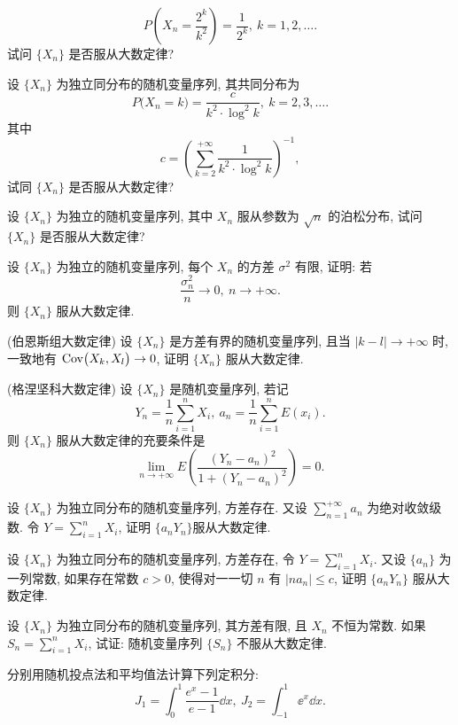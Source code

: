 \begin{xiti}
\begin{equation*}
        P \left( X_n = \frac{2^k}{k^2} \right) = \frac{1}{2^k}, \ k = 1, 2, \dotsc .
    \end{equation*}
    试问 $ \{ X_n \} $ 是否服从大数定律?
    \item 设 $ \{ X_n \} $ 为独立同分布的随机变量序列, 其共同分布为
    \begin{equation*}
        P \bigl( X_n = k \bigr) = \frac{c}{k^2 \cdot \log^2 k}, \ k = 2, 3, \dotsc .
    \end{equation*}
    其中
    \begin{equation*}
        c = \left( \sum_{k = 2}^{+\infty} \frac{1}{k^2 \cdot \log^2 k} \right)^{-1},
    \end{equation*}
    试同 $ \{ X_n \} $ 是否服从大数定律?
    \item 设 $ \{ X_n \} $ 为独立的随机变量序列, 其中 $ X_n $ 服从参数为 $ \sqrt{n} $ 的泊松分布, 试问 $ \{ X_n \} $ 是否服从大数定律?
    \item 设 $ \{ X_n \} $ 为独立的随机变量序列, 每个 $ X_n $ 的方差 $ \sigma^2 $ 有限, 证明: 若
    \begin{equation*}
        \frac{\sigma_n^2}{n} \to 0, \ n \to +\infty.
    \end{equation*}
    则 $ \{ X_n \} $ 服从大数定律.
    \item (伯恩斯组大数定律) 设 $ \{ X_n \} $ 是方差有界的随机变量序列, 且当 $ \lvert k - l \rvert \to +\infty $ 时, 一致地有 $\operatorname{Cov}  \bigl( X_k, X_l \bigr) \to 0 $, 证明 $ \{ X_n \} $ 服从大数定律.
    \item (格涅坚科大数定律) 设 $ \{ X_n \} $ 是随机变量序列, 若记
    \begin{equation*}
        Y_n = \frac{1}{n} \sum_{i=1}^n X_i, \ a_n = \frac{1}{n} \sum_{i=1}^n E (x_i).
    \end{equation*}
    则 $ \{ X_n \} $ 服从大数定律的充要条件是
    \begin{equation*}
        \lim_{n \to +\infty} E \left( \frac{( Y_n - a_n )^2}{1 + ( Y_n - a_n )^2} \right) = 0.
    \end{equation*}
    \item 设 $ \{ X_n \} $ 为独立同分布的随机变量序列, 方差存在.
    又设 $ \sum_{n=1}^{+\infty} a_n $ 为绝对收敛级数.
    令 $ Y = \sum_{i=1}^n X_i $, 证明 $ \{ a_n Y_n \} $服从大数定律.
    \item 设 $ \{ X_n \} $ 为独立同分布的随机变量序列, 方差存在, 令 $ Y = \sum_{i=1}^n X_i $. 又设 $ \{ a_n \} $ 为一列常数, 如果存在常数 $ c > 0 $, 使得对一一切 $ n $ 有 $ \lvert n a_n \rvert \leq c $, 证明 $ \{ a_n Y_n \} $ 服从大数定律.
    \item 设 $ \{ X_n \} $ 为独立同分布的随机变量序列, 其方差有限, 且 $ X_n $ 不恒为常数.
    如果 $ S_n = \sum_{i=1}^n X_i $, 试证: 随机变量序列 $ \{ S_n \} $ 不服从大数定律.
    \item 分别用随机投点法和平均值法计算下列定积分:
    \begin{equation*}
        J_1 = \int_0^1 \frac{e^x - 1}{e - 1} \dd x, \ J_2 = \int_{-1}^1 \ee^x \dd x.
    \end{equation*}
\end{xiti}

